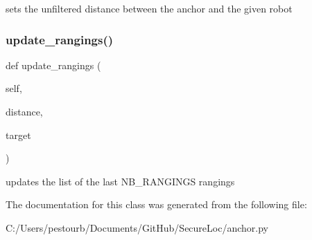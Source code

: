 \begin{DoxyVerb}sets the unfiltered distance between the anchor and the given robot\end{DoxyVerb}
 \mbox{\label{classanchor_1_1_anchor_a531b5973e62d6cfc80655a893b5155f2}} 
\subsubsection{\texorpdfstring{update\+\_\+rangings()}{update\_rangings()}}
{\footnotesize\ttfamily def update\+\_\+rangings (\begin{DoxyParamCaption}\item[{}]{self,  }\item[{}]{distance,  }\item[{}]{target }\end{DoxyParamCaption})}

\begin{DoxyVerb}updates the list of the last NB_RANGINGS rangings\end{DoxyVerb}
 

The documentation for this class was generated from the following file\+:\begin{DoxyCompactItemize}
\item 
C\+:/\+Users/pestourb/\+Documents/\+Git\+Hub/\+Secure\+Loc/anchor.\+py\end{DoxyCompactItemize}

